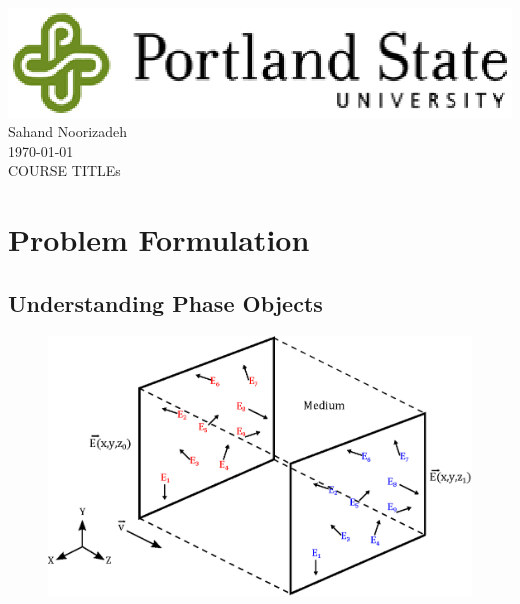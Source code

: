 




\begin{titlepage}
\begin{center}

\setlength{\topskip}{3cm}
\center{\huge{\textsc{ -\\ }}}
\vspace{10 cm}
\includegraphics[scale=0.75, origin=c]{figures/PSU-logo.eps} \\
\vspace{0.75 cm} 
\large{Sahand Noorizadeh } \\
\vspace{0.25 cm} 
\large \today \\
\vspace{1.5 cm}
COURSE TITLEs
\end{center}
\end{titlepage}

\section{Problem Formulation}
\subsection{Understanding Phase Objects}

\begin{figure}[h]
	\centering
	\includegraphics[scale=1]{figures/field_prop.eps}
\end{figure}

